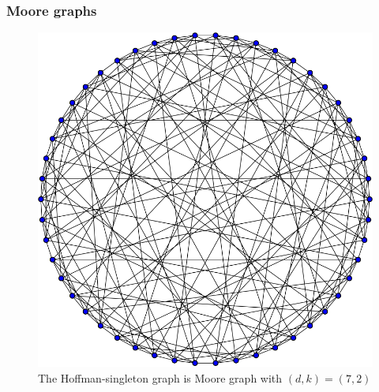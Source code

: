 \documentclass{beamer}
\begin{document}
\begin{frame}
	\frametitle{Moore graphs}
	\begin{figure}[!ht]
 		\centering
 		\includegraphics[scale=0.25]{Hoffman-Singleton_graph.png}
		\caption{The Hoffman-singleton graph is Moore graph with $(d,k)=(7,2)$}
	\end{figure}
\end{frame}
\end{document}
